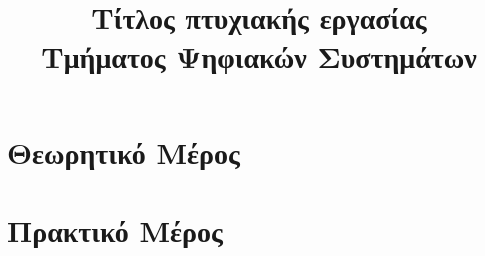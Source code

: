 \documentclass[plain,calibri,hyperref,%
		histinit,noindex]{UoP_DS-thesis-xelatex}
\title{Τίτλος πτυχιακής εργασίας \\ Τμήματος Ψηφιακών Συστημάτων}
\subtitle{}
\begin{document}
\maketitle

\beginfrontmatter
	
	
	
	\tableofcontents
	\listoffigures
	\listofillustrations
	\listoftables
	\listofalgorithms
	
	
\beginmainmatter

	
	\part{Θεωρητικό Μέρος}
		
		
	\part{Πρακτικό Μέρος} 
		
		
		
		
		
\end{document}
